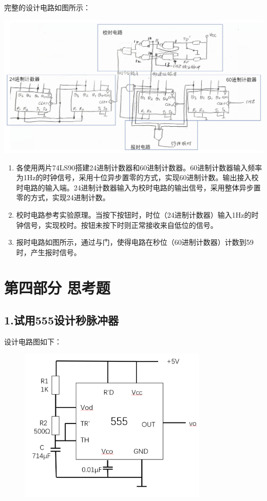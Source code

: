 \documentclass{ctexart}
\begin{document}
    完整的设计电路如图所示：

    \begin{minipage}[c]{\textwidth}
        \centering
        \includegraphics[width=\linewidth]{graph.png} 
    \end{minipage}

    \begin{enumerate}
        \item 各使用两片74LS90搭建24进制计数器和60进制计数器。60进制计数器输入频率为1Hz的时钟信号，采用十位异步置零的方式，实现60进制计数。输出接入校时电路的输入端。24进制计数器输入为校时电路的输出信号，采用整体异步置零的方式，实现24进制计数。
        \item 校时电路参考实验原理。当按下按钮时，时位（24进制计数器）输入1Hz的时钟信号，实现校时。按钮未按下时则正常接收来自低位的信号。
        \item 报时电路如图所示，通过与门，使得电路在秒位（60进制计数器）计数到59时，产生报时信号。
    \end{enumerate}
    
    \newpage
    \section*{第四部分 \quad 思考题}
    \subsection*{1.试用555设计秒脉冲器}
    设计电路图如下：
    \begin{figure}[htbp]
        \centering
        \includegraphics[width=9cm]{4.1.png}
    \end{figure}
\end{document}
